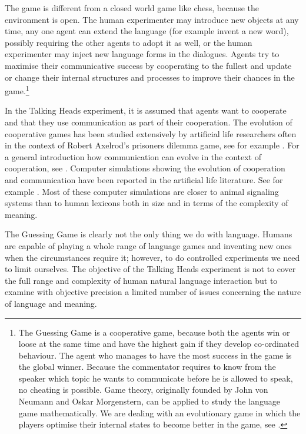 The game is different from a closed world game like 
chess, because the environment is open. The human 
experimenter may introduce new objects at any
time, any one agent can extend
the language (for example invent a new word), possibly
requiring the other agents to adopt it as well, or the
human experimenter may inject new language forms in the 
dialogues. Agents try to maximise their communicative 
success by cooperating to the fullest and update or change
their internal structures and processes \enlargethispage{1\baselineskip}
to improve their chances in the game.\footnote{The Guessing Game is a cooperative game, because
both the agents win or loose at the same time and have 
the highest gain if they develop co-ordinated behaviour. 
The agent who manages to have the most success in the game is 
the global winner. Because the commentator requires to know 
from the speaker which topic he wants to communicate 
before he is allowed to speak, no cheating 
is possible. Game theory, originally founded by John 
von Neumann and Oskar Morgenstern, can be applied to study the 
language game mathematically.  We are dealing with an 
evolutionary game in which the players optimise their 
internal states to become better in the game, see
\cite{Maynard:1982}.}

In the Talking Heads experiment, it is assumed that 
agents want to cooperate and that they use communication
as part of their cooperation. 
The evolution of cooperative games has been studied 
extensively by artificial life researchers often 
in the context of Robert Axelrod's prisoners dilemma game, 
see for example \cite{Ikegami:1994}.  
For a general introduction how communication can 
evolve in the context of cooperation, see \cite{Hauser:1996}. 
Computer simulations showing the evolution of 
cooperation and communication have been reported in the
artificial life literature. See for example \cite{MacLennan:1991}. 
Most of these computer simulations are 
closer to animal signaling systems than to human lexicons
both in size and in terms of the complexity of meaning.

The Guessing Game is clearly not the only thing we do 
with language. Humans are capable of playing a whole 
range of language games and inventing
new ones when the circumstances
require it; however, to do controlled experiments we need
to limit ourselves. The objective of the Talking Heads
experiment is not to cover the full range and complexity
of human natural language interaction but to examine with
objective precision a limited number of issues concerning
the nature of language and meaning. 

